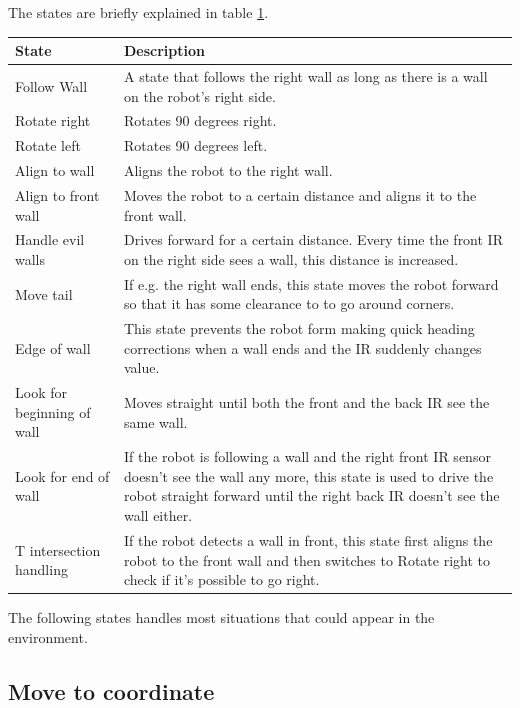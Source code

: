 The states are briefly explained in table \ref{table:followWallStates}. 
\begin{table}
\label{table:followWallStates}
\center
  \begin{tabular}{l|p{10cm}}
    \textbf{State} & \textbf{Description} \\ \hline
    Follow Wall & A state that follows the right wall as long as there is a wall on the robot’s right side. \\ \hline
    Rotate right & Rotates 90 degrees right. \\ \hline
    Rotate left & Rotates 90 degrees left. \\ \hline
    Align to wall & Aligns the robot to the right wall. \\ \hline
    Align to front wall & Moves the robot to a certain distance and aligns it to the front wall. \\ \hline
    Handle evil walls & Drives forward for a certain distance. Every time the front IR on the right side sees a wall, this distance is increased. \\ \hline
    Move tail & If e.g. the right wall ends, this state moves the robot forward so that it has some clearance to to go around corners. \\ \hline
    Edge of wall & This state prevents the robot form making quick heading corrections when a wall ends and the IR suddenly changes value. \\ \hline
    Look for beginning of wall & Moves straight until both the front and the back IR see the same wall.  \\ \hline
    Look for end of wall & If the robot is following a wall and the right front IR sensor doesn’t see the wall any more, this state is used to drive the robot straight forward until the right back IR doesn’t see the wall either. \\ \hline
    T intersection handling & If the robot detects a wall in front, this state first aligns the robot to the front wall and then switches to Rotate right to check if it’s possible to go right. \\ 
    \hline
  \end{tabular}
\end{table}

The following states handles most situations that could appear in the environment.

\subsection{Move to coordinate}

